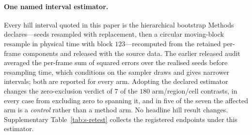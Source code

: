 \documentclass[11pt]{article}
\begin{document}
\paragraph{One named interval estimator.} Every hill interval quoted in this paper is the
hierarchical bootstrap Methods declares---seeds resampled with replacement, then a circular
moving-block resample in physical time with block $123$---recomputed from the retained per-frame
components and released with the source data. The earlier released audit averaged
the per-frame sum of squared errors over the realised seeds before resampling time, which
conditions on the sampler draws and gives narrower intervals; both are reported for
every arm. Adopting the declared estimator changes the zero-exclusion verdict of $7$ of the $180$
arm/region/cell contrasts, in every case from excluding zero to spanning it, and in five of the
seven the affected arm is a \emph{control} rather than a method arm. No headline hill result
changes. Supplementary Table~\ref{tab:s-retest} collects the registered endpoints under this
estimator.
\end{document}
